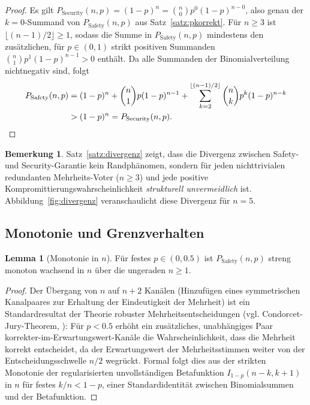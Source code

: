 ﻿\documentclass[a4paper,12pt]{article}
\theoremstyle{definition}
\newtheorem{lemma}{Lemma}
\newtheorem{bemerkung}{Bemerkung}
\begin{document}
\begin{proof}
	Es gilt $P_{\mathrm{Security}}(n,p) = (1-p)^n = \binom{n}{0}p^0(1-p)^{n-0}$, also genau der $k=0$-Summand von $P_{\mathrm{Safety}}(n,p)$ aus Satz~\ref{satz:pkorrekt}. Für $n \geq 3$ ist $\lfloor (n-1)/2 \rfloor \geq 1$, sodass die Summe in $P_{\mathrm{Safety}}(n,p)$ mindestens den zusätzlichen, für $p \in (0,1)$ strikt positiven Summanden $\binom{n}{1}p^1(1-p)^{n-1} > 0$ enthält. Da alle Summanden der Binomialverteilung nichtnegativ sind, folgt
	\begin{align*}
	P_{\mathrm{Safety}}(n,p) &= (1-p)^n + \binom{n}{1}p(1-p)^{n-1} + \sum_{k=2}^{\lfloor (n-1)/2\rfloor} \binom{n}{k}p^k(1-p)^{n-k} \\
	&> (1-p)^n = P_{\mathrm{Security}}(n,p). \qedhere
	\end{align*}
\end{proof}

\begin{bemerkung}
	Satz~\ref{satz:divergenz} zeigt, dass die Divergenz zwischen Safety- und Security-Garantie kein Randphänomen, sondern für jeden nichttrivialen redundanten Mehrheits-Voter ($n\geq 3$) und jede positive Kompromittierungswahrscheinlichkeit \emph{strukturell unvermeidlich} ist. Abbildung~\ref{fig:divergenz} veranschaulicht diese Divergenz für $n=5$.
\end{bemerkung}

\subsection{Monotonie und Grenzverhalten}

\begin{lemma}[Monotonie in $n$]
	\label{lem:monotonie}
	Für festes $p \in (0, 0.5)$ ist $P_{\mathrm{Safety}}(n,p)$ streng monoton wachsend in $n$ über die ungeraden $n \geq 1$.
\end{lemma}

\begin{proof}
	Der Übergang von $n$ auf $n+2$ Kanälen (Hinzufügen eines symmetrischen Kanalpaares zur Erhaltung der Eindeutigkeit der Mehrheit) ist ein Standardresultat der Theorie robuster Mehrheitsentscheidungen (vgl. Condorcet-Jury-Theorem, \cite{condorcet1785}): Für $p < 0.5$ erhöht ein zusätzliches, unabhängiges Paar korrekter-im-Erwartungswert-Kanäle die Wahrscheinlichkeit, dass die Mehrheit korrekt entscheidet, da der Erwartungswert der Mehrheitsstimmen weiter von der Entscheidungsschwelle $n/2$ wegrückt. Formal folgt dies aus der strikten Monotonie der regularisierten unvollständigen Betafunktion $I_{1-p}(n-k,k+1)$ in $n$ für festes $k/n < 1-p$, einer Standardidentität zwischen Binomialsummen und der Betafunktion. \qedhere
\end{proof}
\end{document}
